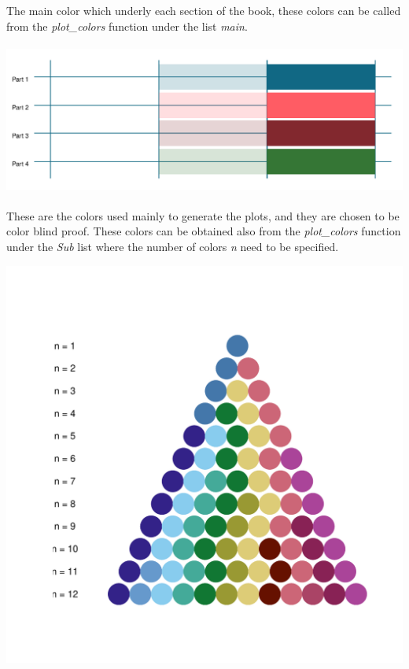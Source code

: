 \documentclass{article}\usepackage{graphicx, color}
\makeatletter
\def\maxwidth{ %
  \ifdim\Gin@nat@width>\linewidth
    \linewidth
  \else
    \Gin@nat@width
  \fi
}
\newenvironment{knitrout}{}{} %
\makeatother
\begin{document}
The main color which underly each section of the book, these colors
can be called from the \textit{plot\_colors} function under the list
\textit{main}.

\begin{knitrout}
\color{fgcolor}

{\centering \includegraphics[width=\maxwidth,height=5cm]{figure/minimal-main-color} 

}



\end{knitrout}


These are the colors used mainly to generate the plots, and they are
chosen to be color blind proof. These colors can be obtained also from
the \textit{plot\_colors} function under the \textit{Sub} list where the
number of colors \textit{n} need to be specified.

\begin{knitrout}
\color{fgcolor}

{\centering \includegraphics[width=\maxwidth]{figure/minimal-sub-color} 

}



\end{knitrout}
\end{document}
